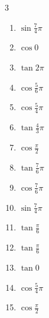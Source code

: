 \begin{multicols}{3}
\begin{enumerate}
  \item $\displaystyle \sin{\frac{7}{4}\pi}$

  \item $\displaystyle \cos{0}$
        \phantom{$\displaystyle =1$}

  \item $\displaystyle \tan{2\pi}$
        \phantom{$\displaystyle =0$}

  \item $\displaystyle \cos{\frac{5}{6}\pi}$

  \item $\displaystyle \cos{\frac{5}{4}\pi}$

  \item $\displaystyle \tan{\frac{4}{3}\pi}$

  \item $\displaystyle \cos{\frac{\pi}{2}}$
        \phantom{$\displaystyle =0$}

  \item $\displaystyle \tan{\frac{7}{6}\pi}$

  \item $\displaystyle \cos{\frac{7}{6}\pi}$

  \item $\displaystyle \sin{\frac{7}{4}\pi}$

  \item $\displaystyle \tan{\frac{\pi}{6}}$

\columnbreak %

  \item $\displaystyle \tan{\frac{\pi}{6}}$

  \item $\displaystyle \tan{0}$
        \phantom{$\displaystyle =0$}

  \item $\displaystyle \cos{\frac{5}{4}\pi}$

  \item $\displaystyle \cos{\frac{\pi}{2}}$
        \phantom{$\displaystyle =0$}


\end{enumerate}
\end{multicols}

